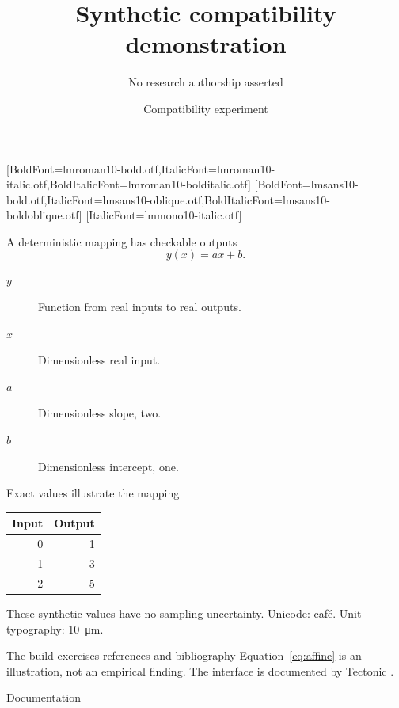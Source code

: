 \usepackage{fontspec,unicode-math,mathtools,siunitx,booktabs,csquotes,listings,tikz}
\setmainfont{lmroman10-regular.otf}[BoldFont=lmroman10-bold.otf,ItalicFont=lmroman10-italic.otf,BoldItalicFont=lmroman10-bolditalic.otf]
\setsansfont{lmsans10-regular.otf}[BoldFont=lmsans10-bold.otf,ItalicFont=lmsans10-oblique.otf,BoldItalicFont=lmsans10-boldoblique.otf]
\setmonofont{lmmono10-regular.otf}[ItalicFont=lmmono10-italic.otf]
\usepackage[backend=biber,style=numeric,sorting=none]{biblatex}

\title{Synthetic compatibility demonstration}
\author{No research authorship asserted}
\date{Compatibility experiment}

\begin{frame}\titlepage\end{frame}
\begin{frame}{A deterministic mapping has checkable outputs}
\begin{equation}\label{eq:affine}y(x)=a x+b.\end{equation}
\begin{description}
\item[$y$] Function from real inputs to real outputs.
\item[$x$] Dimensionless real input.
\item[$a$] Dimensionless slope, two.
\item[$b$] Dimensionless intercept, one.
\end{description}
\end{frame}
\begin{frame}{Exact values illustrate the mapping}
\begin{tabular}{rr}\toprule Input & Output\\\midrule
0 & 1\\1 & 3\\2 & 5\\\bottomrule\end{tabular}
\pause
\par These synthetic values have no sampling uncertainty.
Unicode: café. Unit typography: \SI{10}{\micro\metre}.
\end{frame}
\begin{frame}{The build exercises references and bibliography}
Equation~\ref{eq:affine} is an illustration, not an empirical finding.
The interface is documented by Tectonic \cite{tectonic-interface}.
\end{frame}
\appendix
\begin{frame}{Documentation}\printbibliography[heading=none]\end{frame}

